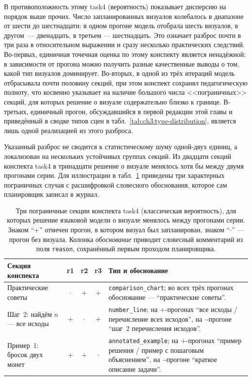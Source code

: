 В противоположность этому task4 (вероятность) показывает дисперсию на порядок выше прочих. Число запланированных визуалов колебалось в диапазоне от шести до шестнадцати: в одном прогоне модель отобрала шесть визуалов, в другом~--- двенадцать, в третьем --- шестнадцать. Это означает разброс почти в три раза в относительном выражении и сразу несколько практических следствий. Во-первых, единичная точечная оценка по этому конспекту является ненадёжной: в зависимости от прогона можно получить разные качественные выводы о том, какой тип визуалов доминирует. Во-вторых, в одной из трёх итераций модель отбрасывала почти половину секций, при этом конспект сохранял педагогическую полноту, что косвенно указывает на наличие большого числа <<пограничных>> секций, для которых решение о визуале содержательно близко к границе. В-третьих, единичный прогон, обсуждавшийся в первой редакции этой главы и приведённый в сводке типов сцен в табл.~\ref{tab:ch3:type-distribution}, является лишь одной реализацией из этого разброса.

Указанный разброс не сводится к статистическому шуму одной\nobreakdash-двух единиц, а локализован на нескольких устойчивых группах секций. Из двадцати секций конспекта task4 в тринадцати решение о визуале менялось хотя бы между двумя прогонами серии. Для иллюстрации в табл.~\ref{tab:ch3:borderline-task4} приведены три характерных пограничных случая с расшифровкой словесного обоснования, которое сам планировщик записал в журнал.

\begin{table}[htbp]
\centering
\caption{Три пограничные секции конспекта task4 (классическая вероятность), для которых решение языковой модели о визуале менялось между прогонами серии. Знаком ``$+$'' отмечен прогон, в котором визуал был запланирован, знаком ``$\cdot$'' --- прогон без визуала. Колонка \emph{обоснование} приводит словесный комментарий из поля \texttt{reason}, сохранённый первым проходом планировщика.}
\label{tab:ch3:borderline-task4}
\small
\begin{tabular}{p{4cm} c c c p{6cm}}
\toprule
\textbf{Секция конспекта} & \textbf{r1} & \textbf{r2} & \textbf{r3} & \textbf{Тип и обоснование} \\
\midrule
Практические советы          & $\cdot$ & $+$ & $+$ & \texttt{comparison\_chart}; во всех трёх прогонах обоснование --- ``практические советы''. \\
\addlinespace
Шаг~2: найдём $n$ --- все исходы & $+$ & $\cdot$ & $+$ & \texttt{number\_line}; на $+$-прогонах ``все исходы / перечисление всех исходов'', на $\cdot$-прогоне ``шаг~2 перечисления исходов''. \\
\addlinespace
Пример~1: бросок двух монет  & $+$ & $+$ & $\cdot$ & \texttt{annotated\_example}; на $+$-прогонах ``пример решения / пример с пошаговым объяснением'', на $\cdot$-прогоне ``краткое описание задачи''. \\
\bottomrule
\end{tabular}
\end{table}

